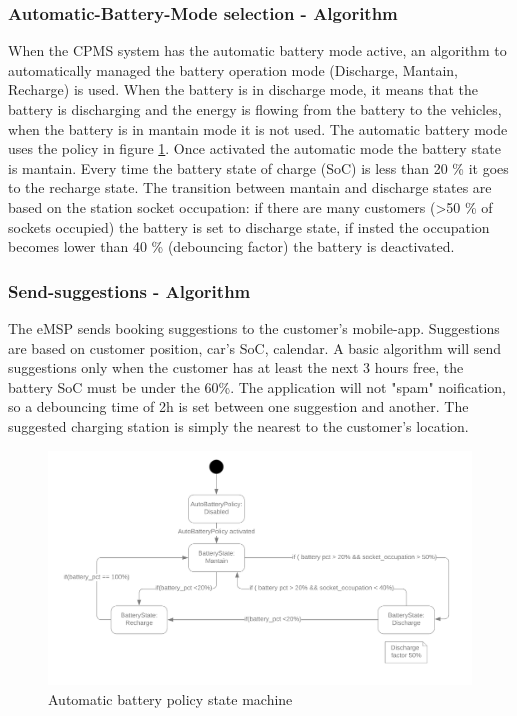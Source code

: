 \subsubsection{Automatic-Battery-Mode selection - Algorithm}
When the CPMS system has the automatic battery mode active, an algorithm to automatically managed the battery operation mode  (Discharge, Mantain, Recharge) is used. When the battery is in discharge mode, it means that the battery is discharging and the energy is flowing from the battery to the vehicles, when the battery is in mantain mode it is not used. The automatic battery mode uses the policy in figure \ref{battery_policy}. Once activated the automatic mode the battery state is mantain. Every time the battery state of charge (SoC) is less than 20 \% it goes to the recharge state.
The transition between mantain and discharge states are based on the station socket occupation: if there are many customers (>50 \% of sockets occupied) the battery is set to discharge state, if insted the occupation becomes lower than 40 \% (debouncing factor) the battery is deactivated.

\subsubsection{Send-suggestions - Algorithm}
The eMSP sends booking suggestions to the customer's mobile-app. Suggestions are based on customer position, car's SoC, calendar. A basic algorithm will send suggestions only when the customer has at least the next 3 hours free, the battery SoC must be under the 60\%. The application will not "spam" noification, so a debouncing time of 2h is set between one suggestion and another. The suggested charging station is simply the nearest to the customer's location.

\begin{center}
    \begin{figure}[H]
        \includegraphics[width=\textwidth]{./img/battery_policy.png}
        \caption{Automatic battery policy state machine}
        \label{battery_policy}
    \end{figure}
\end{center}